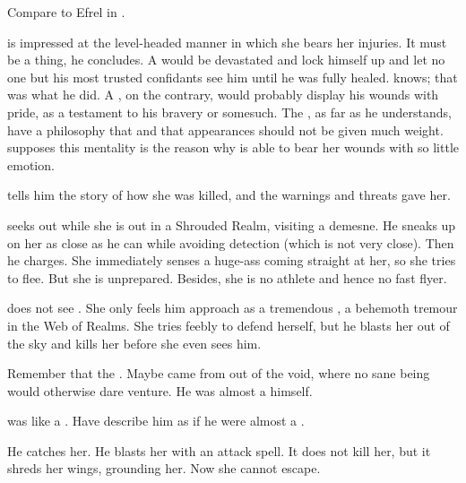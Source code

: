 Compare to Efrel in \cite{KarlEdwardWagner:DarknessWeaves}. 

\Teshrial is impressed at the level-headed manner in which she bears her injuries. 
It must be a \TiphredSerah thing, he concludes. 
A \CiriathSepher would be devastated and lock himself up and let no one but his most trusted confidants see him until he was fully healed. 
\Teshrial knows; that was what he did.
A \Mystraacht, on the contrary, would probably display his wounds with pride, as a testament to his bravery or somesuch. 
The \TiphredSerah, as far as he understands, have a philosophy that  and that appearances should not be given much weight. 
\Teshrial supposes this mentality is the reason why \Urizeth is able to bear her wounds with so little emotion. 

\begin{comment}
  \section{Urizeth tells her story}
\end{comment}

\Urizeth{} tells him the story of how she was killed, and the warnings and threats \Ishnaruchaefir{} gave her. 

\Ishnaruchaefir{} seeks out \Urizeth{} while she is out in a Shrouded Realm, visiting a demesne. 
He sneaks up on her as close as he can while avoiding detection (which is not very close). 
Then he charges. 
She immediately senses a huge-ass \vertex{} coming straight at her, so she tries to flee. 
But she is unprepared. 
Besides, she is no athlete and hence no fast flyer. 

\Urizeth does not see \Ishnaruchaefir.
She only feels him approach as a tremendous \vertex, a behemoth tremour in the Web of Realms. 
She tries feebly to defend herself, but he blasts her out of the sky and kills her before she even sees him.
    
Remember that the .
Maybe \Ishnaruchaefir came from out of the void, where no sane being would otherwise dare venture. 
He was almost a  himself. 

\Ishnaruchaefir was like a \xs. 
Have \Urizeth describe him as if he were almost a \xs.

He catches her. 
He blasts her with an attack spell. 
It does not kill her, but it shreds her wings, grounding her. 
Now she cannot escape. 

